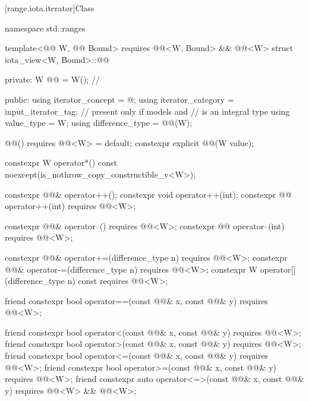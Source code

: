 [range.iota.iterator]{Class }

\begin{codeblock}
namespace std::ranges {
  template<@@ W, @@ Bound>
    requires @@<W, Bound> && @@<W>
  struct iota_view<W, Bound>::@@ {
  private:
    W @@ = W();             // \expos

  public:
    using iterator_concept = @\seebelow@;
    using iterator_category = input_iterator_tag;       // present only if  models  and
                                                        //  is an integral type
    using value_type = W;
    using difference_type = @@(W);

    @@() requires @@<W> = default;
    constexpr explicit @@(W value);

    constexpr W operator*() const noexcept(is_nothrow_copy_constructible_v<W>);

    constexpr @@& operator++();
    constexpr void operator++(int);
    constexpr @@ operator++(int) requires @@<W>;

    constexpr @@& operator--() requires @@<W>;
    constexpr @@ operator--(int) requires @@<W>;

    constexpr @@& operator+=(difference_type n)
      requires @@<W>;
    constexpr @@& operator-=(difference_type n)
      requires @@<W>;
    constexpr W operator[](difference_type n) const
      requires @@<W>;

    friend constexpr bool operator==(const @@& x, const @@& y)
      requires @@<W>;

    friend constexpr bool operator<(const @@& x, const @@& y)
      requires @@<W>;
    friend constexpr bool operator>(const @@& x, const @@& y)
      requires @@<W>;
    friend constexpr bool operator<=(const @@& x, const @@& y)
      requires @@<W>;
    friend constexpr bool operator>=(const @@& x, const @@& y)
      requires @@<W>;
    friend constexpr auto operator<=>(const @@& x, const @@& y)
      requires @@<W> && @@<W>;

}}
\end{codeblock}
